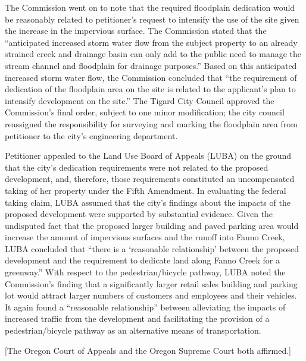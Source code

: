 The Commission went on to note that the required floodplain dedication would be
reasonably related to petitioner's request to intensify the use of the site
given the increase in the impervious surface. The Commission stated that the
``anticipated increased storm water flow from the subject property to an already
strained creek and drainage basin can only add to the public need to manage the
stream channel and floodplain for drainage purposes.'' Based on this anticipated
increased storm water flow, the Commission concluded that ``the requirement of
dedication of the floodplain area on the site is related to the applicant's plan
to intensify development on the site.'' The Tigard City Council approved the
Commission's final order, subject to one minor modification; the city council
reassigned the responsibility for surveying and marking the floodplain area from
petitioner to the city's engineering department. 

Petitioner appealed to the Land Use Board of Appeals (LUBA) on the ground that
the city's dedication requirements were not related to the proposed development,
and, therefore, those requirements constituted an uncompensated taking of her
property under the Fifth Amendment. In evaluating the federal taking claim, LUBA
assumed that the city's findings about the impacts of the proposed development
were supported by substantial evidence. Given the undisputed fact that the
proposed larger building and paved parking area would increase the amount of
impervious surfaces and the runoff into Fanno Creek, LUBA concluded that ``there
is a `reasonable relationship' between the proposed development and the
requirement to dedicate land along Fanno Creek for a greenway.'' With respect to
the pedestrian/bicycle pathway, LUBA noted the Commission's finding that a
significantly larger retail sales building and parking lot would attract larger
numbers of customers and employees and their vehicles. It again found a
``reasonable relationship'' between alleviating the impacts of increased traffic
from the development and facilitating the provision of a pedestrian/bicycle
pathway as an alternative means of transportation. 

[The Oregon Court of Appeals and the Oregon Supreme Court both affirmed.]




